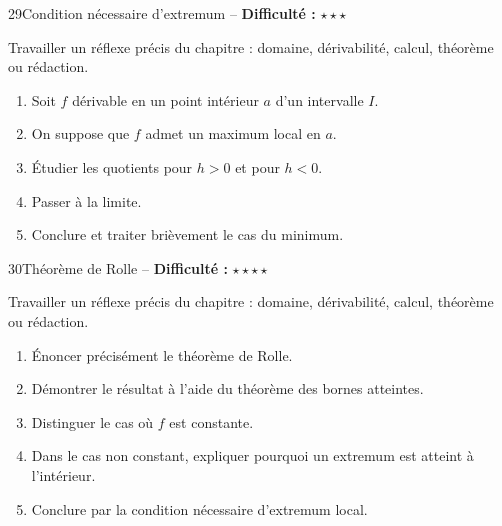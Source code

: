 \documentclass[11pt,a4paper]{article}
\newcommand{\etoiles}[1]{\textbf{Difficulté :} #1}
\begin{document}
\begin{exobox}{29}{Condition nécessaire d'extremum -- \etoiles{$\star\star\star$}}

\begin{objectifbox}
Travailler un réflexe précis du chapitre : domaine, dérivabilité, calcul, théorème ou rédaction.
\end{objectifbox}

\begin{enumerate}

\item Soit $f$ dérivable en un point intérieur $a$ d'un intervalle $I$.

\item On suppose que $f$ admet un maximum local en $a$.

\item Étudier les quotients pour $h>0$ et pour $h<0$.

\item Passer à la limite.

\item Conclure et traiter brièvement le cas du minimum.

\end{enumerate}

\end{exobox}


\begin{exobox}{30}{Théorème de Rolle -- \etoiles{$\star\star\star\star$}}

\begin{objectifbox}
Travailler un réflexe précis du chapitre : domaine, dérivabilité, calcul, théorème ou rédaction.
\end{objectifbox}

\begin{enumerate}

\item Énoncer précisément le théorème de Rolle.

\item Démontrer le résultat à l'aide du théorème des bornes atteintes.

\item Distinguer le cas où $f$ est constante.

\item Dans le cas non constant, expliquer pourquoi un extremum est atteint à l'intérieur.

\item Conclure par la condition nécessaire d'extremum local.

\end{enumerate}

\end{exobox}
\end{document}

